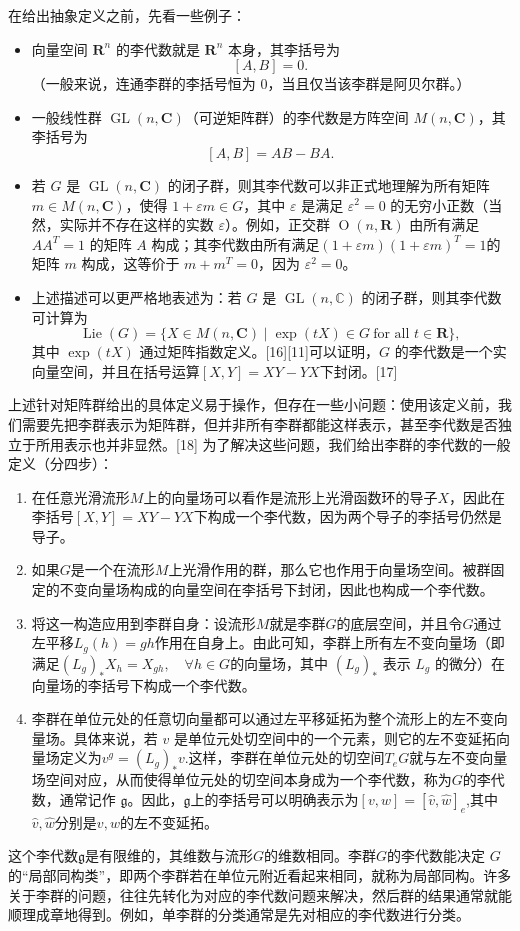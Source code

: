 在给出抽象定义之前，先看一些例子：
\begin{itemize}
\item 向量空间 $\mathbf{R}^n$ 的李代数就是 $\mathbf{R}^n$ 本身，其李括号为
  $$
  [A, B] = 0.~
  $$
  （一般来说，连通李群的李括号恒为 0，当且仅当该李群是阿贝尔群。）
\item 一般线性群 $\operatorname{GL}(n,\mathbf{C})$（可逆矩阵群）的李代数是方阵空间 $M(n,\mathbf{C})$，其李括号为
  $$
  [A, B] = AB - BA.~
  $$
\item 若 $G$ 是 $\operatorname{GL}(n,\mathbf{C})$ 的闭子群，则其李代数可以非正式地理解为所有矩阵 $m \in M(n,\mathbf{C})$，使得 $1 + \varepsilon m \in G$，其中 $\varepsilon$ 是满足 $\varepsilon^2 = 0$ 的无穷小正数（当然，实际并不存在这样的实数 $\varepsilon$）。例如，正交群 $\operatorname{O}(n,\mathbf{R})$ 由所有满足 $AA^{T} = 1$ 的矩阵 $A$ 构成；其李代数由所有满足$(1 + \varepsilon m)(1 + \varepsilon m)^{T} = 1$的矩阵 $m$ 构成，这等价于 $m + m^{T} = 0$，因为 $\varepsilon^{2} = 0$。
\item 上述描述可以更严格地表述为：若 $G$ 是 $\operatorname{GL}(n,\mathbb{C})$ 的闭子群，则其李代数可计算为
$$
\operatorname{Lie}(G) = \{ X \in M(n,\mathbf{C}) \mid \exp(tX) \in G \ \text{for all } t \in \mathbf{R} \},~
$$
其中 $\exp(tX)$ 通过矩阵指数定义。[16][11]可以证明，$G$ 的李代数是一个实向量空间，并且在括号运算$[X, Y] = XY - YX$下封闭。[17]
\end{itemize}
上述针对矩阵群给出的具体定义易于操作，但存在一些小问题：使用该定义前，我们需要先把李群表示为矩阵群，但并非所有李群都能这样表示，甚至李代数是否独立于所用表示也并非显然。[18] 为了解决这些问题，我们给出李群的李代数的一般定义（分四步）：
\begin{enumerate}
\item 在任意光滑流形$M$上的向量场可以看作是流形上光滑函数环的导子$X$，因此在李括号$[X, Y] = XY - YX$下构成一个李代数，因为两个导子的李括号仍然是导子。
\item 如果$G$是一个在流形$M$上光滑作用的群，那么它也作用于向量场空间。被群固定的不变向量场构成的向量空间在李括号下封闭，因此也构成一个李代数。
\item 将这一构造应用到李群自身：设流形$M$就是李群$G$的底层空间，并且令$G$通过左平移$L_{g}(h) = gh$作用在自身上。由此可知，李群上所有左不变向量场（即满足$(L_{g})_{*}X_{h} = X_{gh}, \quad \forall h \in G$的向量场，其中 $(L_{g})_{*}$ 表示 $L_{g}$ 的微分）在向量场的李括号下构成一个李代数。
\item 李群在单位元处的任意切向量都可以通过左平移延拓为整个流形上的左不变向量场。具体来说，若 $v$ 是单位元处切空间中的一个元素，则它的左不变延拓向量场定义为$v^{g} = (L_{g})_{*}v$.这样，李群在单位元处的切空间$T_{e}G$就与左不变向量场空间对应，从而使得单位元处的切空间本身成为一个李代数，称为$G$的李代数，通常记作 $\mathfrak{g}$。因此，$\mathfrak{g}$上的李括号可以明确表示为$[v, w] = [\hat{v}, \hat{w}]_{e}$,其中$\hat{v}, \hat{w}$分别是$v, w$的左不变延拓。
\end{enumerate}
这个李代数$\mathfrak{g}$是有限维的，其维数与流形$G$的维数相同。李群$G$的李代数能决定 $G$的“局部同构类”，即两个李群若在单位元附近看起来相同，就称为局部同构。许多关于李群的问题，往往先转化为对应的李代数问题来解决，然后群的结果通常就能顺理成章地得到。例如，单李群的分类通常是先对相应的李代数进行分类。

